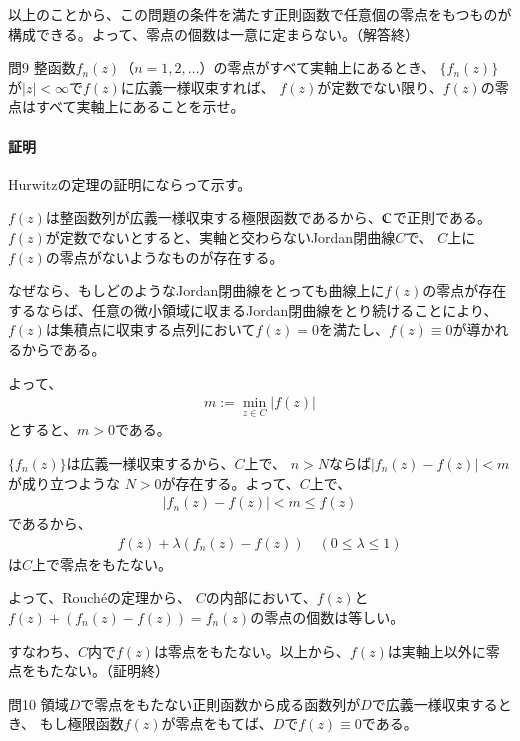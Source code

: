 以上のことから、この問題の条件を満たす正則函数で任意個の零点をもつものが構成できる。よって、零点の個数は一意に定まらない。（解答終）

\newpage
\begin{mysimplebox}{問9}
    整函数$f_n(z)$（$n=1,2,\dots$）の零点がすべて実軸上にあるとき、
    $\{f_n(z)\}$が$|z|<\infty$で$f(z)$に広義一様収束すれば、
    $f(z)$が定数でない限り、$f(z)$の零点はすべて実軸上にあることを示せ。
\end{mysimplebox}
\paragraph{証明}
Hurwitzの定理の証明にならって示す。

$f(z)$は整函数列が広義一様収束する極限函数であるから、$\mathbb{C}$で正則である。
$f(z)$が定数でないとすると、実軸と交わらないJordan閉曲線$C$で、
$C$上に$f(z)$の零点がないようなものが存在する。

なぜなら、もしどのようなJordan閉曲線をとっても曲線上に$f(z)$の零点が存在するならば、任意の微小領域に収まるJordan閉曲線をとり続けることにより、$f(z)$は集積点に収束する点列において$f(z)=0$を満たし、$f(z)\equiv0$が導かれるからである。


よって、
\begin{align*}
    m:=\min_{z\in C}|f(z)|
\end{align*}
とすると、$m>0$である。

$\{f_n(z)\}$は広義一様収束するから、$C$上で、
$n>N$ならば$|f_n(z)-f(z)|<m$が成り立つような
$N>0$が存在する。よって、$C$上で、
\begin{align*}
    |f_n(z)-f(z)|<m\le f(z)
\end{align*}
であるから、
\begin{align*}
    f(z)+\lambda (f_n(z)-f(z))\quad(0\le\lambda\le1)
\end{align*}
は$C$上で零点をもたない。

よって、Rouch\'{e}の定理から、
$C$の内部において、$f(z)$と\\
$f(z)+(f_n(z)-f(z))=f_n(z)$の零点の個数は等しい。

すなわち、$C$内で$f(z)$は零点をもたない。以上から、$f(z)$は実軸上以外に零点をもたない。（証明終）

\newpage
\begin{mysimplebox}{問10}
    領域$D$で零点をもたない正則函数から成る函数列が$D$で広義一様収束するとき、
    もし極限函数$f(z)$が零点をもてば、$D$で$f(z)\equiv0$である。
\end{mysimplebox}
